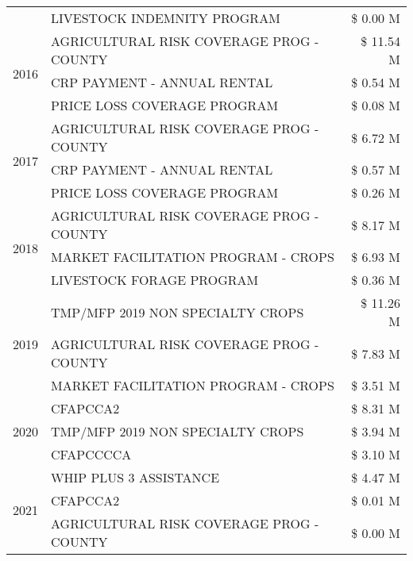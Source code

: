 \begin{tabular}{llr}
 & LIVESTOCK INDEMNITY PROGRAM & \$ 0.00 M \\
\cline{1-3}
\multirow[t]{3}{*}{2016} & AGRICULTURAL RISK COVERAGE PROG - COUNTY & \$ 11.54 M \\
 & CRP PAYMENT - ANNUAL RENTAL & \$ 0.54 M \\
 & PRICE LOSS COVERAGE PROGRAM & \$ 0.08 M \\
\cline{1-3}
\multirow[t]{3}{*}{2017} & AGRICULTURAL RISK COVERAGE PROG - COUNTY & \$ 6.72 M \\
 & CRP PAYMENT - ANNUAL RENTAL & \$ 0.57 M \\
 & PRICE LOSS COVERAGE PROGRAM & \$ 0.26 M \\
\cline{1-3}
\multirow[t]{3}{*}{2018} & AGRICULTURAL RISK COVERAGE PROG - COUNTY & \$ 8.17 M \\
 & MARKET FACILITATION PROGRAM - CROPS & \$ 6.93 M \\
 & LIVESTOCK FORAGE PROGRAM & \$ 0.36 M \\
\cline{1-3}
\multirow[t]{3}{*}{2019} & TMP/MFP 2019 NON SPECIALTY CROPS & \$ 11.26 M \\
 & AGRICULTURAL RISK COVERAGE PROG - COUNTY & \$ 7.83 M \\
 & MARKET FACILITATION PROGRAM - CROPS & \$ 3.51 M \\
\cline{1-3}
\multirow[t]{3}{*}{2020} & CFAPCCA2 & \$ 8.31 M \\
 & TMP/MFP 2019 NON SPECIALTY CROPS & \$ 3.94 M \\
 & CFAPCCCCA & \$ 3.10 M \\
\cline{1-3}
\multirow[t]{3}{*}{2021} & WHIP PLUS 3 ASSISTANCE & \$ 4.47 M \\
 & CFAPCCA2 & \$ 0.01 M \\
 & AGRICULTURAL RISK COVERAGE PROG - COUNTY & \$ 0.00 M \\
\cline{1-3}
\bottomrule
\end{tabular}
